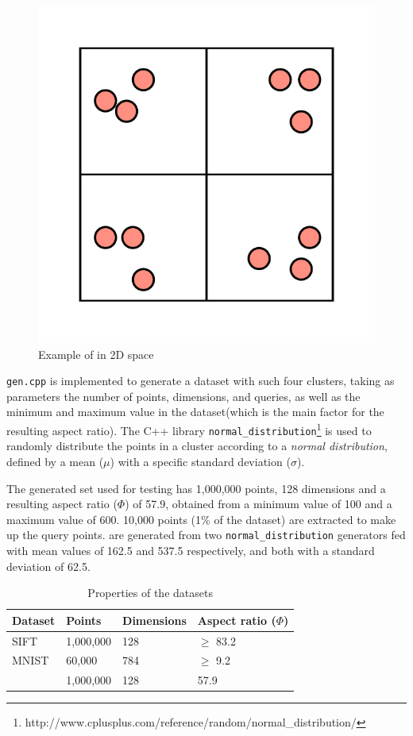 \begin{figure}[h]
	\centering
	\includegraphics[scale=0.5]{figures/Clusters_example.png}
	\caption{Example of \clust{} in 2D space}
	\label{fig:clusters}
\end{figure}


\texttt{gen.cpp} is implemented to generate a dataset with such four clusters, taking as parameters the number of points, dimensions, and queries, as well as the minimum and maximum value in the dataset(which is the main factor for the resulting aspect ratio). The C++ library \texttt{normal\_distribution}\footnote{http://www.cplusplus.com/reference/random/normal\_distribution/} is used to randomly distribute the points in a cluster according to a \textit{normal distribution}, defined by a mean ($\mu$) with a specific standard deviation ($\sigma$). 

The generated set used for testing has 1,000,000 points, 128 dimensions and a resulting aspect ratio ($\Phi$) of 57.9, obtained from a minimum value of 100 and a maximum value of 600. 10,000 points (1\% of the dataset) are extracted to make up the query points. \clust{} are generated from two \texttt{normal\_distribution} generators fed with mean values of 162.5 and 537.5 respectively, and both with a standard deviation of 62.5.

\begin{table}[h]
\centering
\begin{tabular}{l l l l}
	\hline
	Dataset & Points & Dimensions & Aspect ratio ($\Phi$) \\
	\hline
	SIFT & 1,000,000 & 128 & $\geq$ 83.2 \\
	MNIST & 60,000 & 784 & $\geq$ 9.2 \\
	\clust{} & 1,000,000 & 128 & 57.9 \\
	\hline
\end{tabular}
\caption{Properties of the datasets}
\label{tab:datasets}
\end{table}

\clearpage